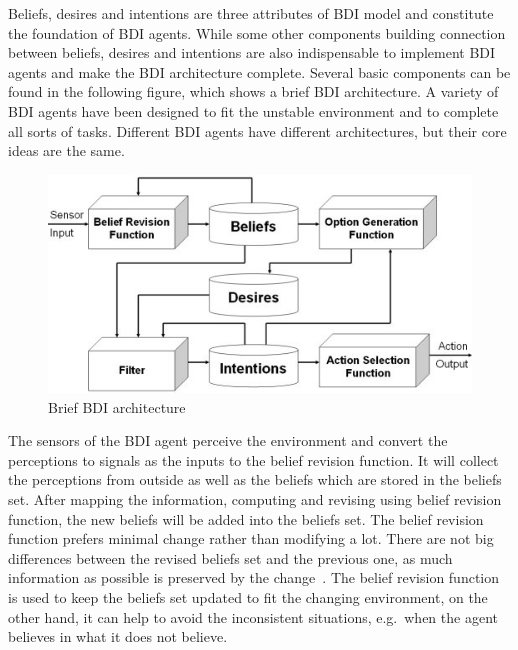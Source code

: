 Beliefs, desires and intentions are three attributes of BDI model and constitute the foundation of BDI agents.
While some other components building connection between beliefs, desires and intentions are also indispensable to implement BDI agents and make the BDI architecture complete.
Several basic components can be found in the following figure, which shows a brief BDI architecture.
A variety of BDI agents have been designed to fit the unstable environment and to complete all sorts of tasks.
Different BDI agents have different architectures, but their core ideas are the same.

\begin{figure}[htbp]
  \centering
  \includegraphics[width=\textwidth]{images/BDIAr}
  \caption{Brief BDI architecture~\cite{BDIA}}%
  \label{fig:Brief BDI architecture}
\end{figure}

The sensors of the BDI agent perceive the environment and convert the perceptions to signals as the inputs to the belief revision function.
It will collect the perceptions from outside as well as the beliefs which are stored in the beliefs set.
After mapping the information, computing and revising using belief revision function, the new beliefs will be added into the beliefs set.
The belief revision function prefers minimal change rather than modifying a lot.
There are not big differences between the revised beliefs set and the previous one, as much information as possible is preserved by the change~\cite{Antje_SpatialBelief_2011}.
The belief revision function is used to keep the beliefs set updated to fit the changing environment, on the other hand, it can help to avoid the inconsistent situations, e.g.\ when the agent believes in what it does not believe.

